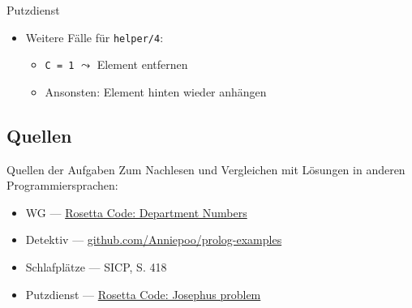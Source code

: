\documentclass{beamer}
\begin{document}
\begin{frame}{Putzdienst}

	\begin{itemize}
		\item Weitere Fälle für \texttt{helper/4}:
		\begin{itemize}
			\item \texttt{C = 1} $\leadsto$ Element entfernen
			\item Ansonsten: Element hinten wieder anhängen
		\end{itemize}
	\end{itemize}
\end{frame}

\subsection{Quellen}

\begin{frame}{Quellen der Aufgaben}
	Zum Nachlesen und Vergleichen mit Lösungen in anderen Programmiersprachen:
	\begin{itemize}
		\item WG --- \href{https://rosettacode.org/wiki/Department_Numbers}{Rosetta Code: Department Numbers}
		\item Detektiv --- \href{https://github.com/Anniepoo/prolog-examples/blob/master/newdetective.pl}{github.com/Anniepoo/prolog-examples}
		\item Schlafplätze --- SICP, S. 418
		\item Putzdienst --- \href{https://rosettacode.org/wiki/Josephus_problem}{Rosetta Code: Josephus problem}
	\end{itemize}
\end{frame}

\end{document}
